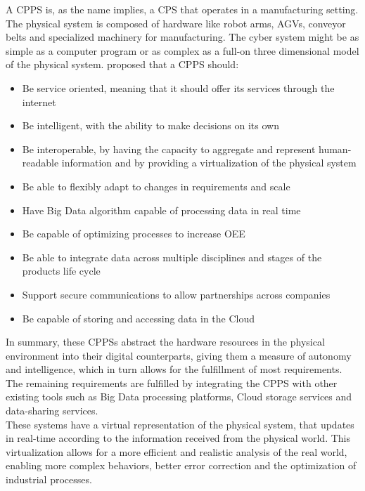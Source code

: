 A \Gls{CPPS} is, as the name implies, a \gls{CPS} that operates in a manufacturing setting. The physical system is composed of hardware like robot arms, \gls{AGV}s, conveyor belts and specialized machinery for manufacturing. The cyber system might be as simple as a computer program or as complex as a full-on three dimensional model of the physical system. \citeauthor{birgit01} \cite{birgit01} proposed that a \gls{CPPS} should:
\begin{itemize}
	\item Be service oriented, meaning that it should offer its services through the internet
	\item Be intelligent, with the ability to make decisions on its own
	\item Be interoperable, by having the capacity to aggregate and represent human-readable information and by providing a virtualization of the physical system
	\item Be able to flexibly adapt to changes in requirements and scale
	\item Have Big Data algorithm capable of processing data in real time
	\item Be capable of optimizing processes to increase \gls{OEE}
	\item Be able to integrate data across multiple disciplines and stages of the products life cycle
	\item Support secure communications to allow partnerships across companies
	\item Be capable of storing and accessing data in the Cloud
\end{itemize}

In summary, these \gls{CPPS}s abstract the hardware resources in the physical environment into their digital counterparts, giving them a measure of autonomy and intelligence, which in turn allows for the fulfillment of most requirements. The remaining requirements are fulfilled by integrating the \gls{CPPS} with other existing tools such as Big Data processing platforms, Cloud storage services and data-sharing services. \\

These systems have a virtual representation of the physical system, that updates in real-time according to the information received from the physical world. This virtualization allows for a more efficient and realistic analysis of the real world, enabling more complex behaviors, better error correction and the optimization of industrial processes.\\

